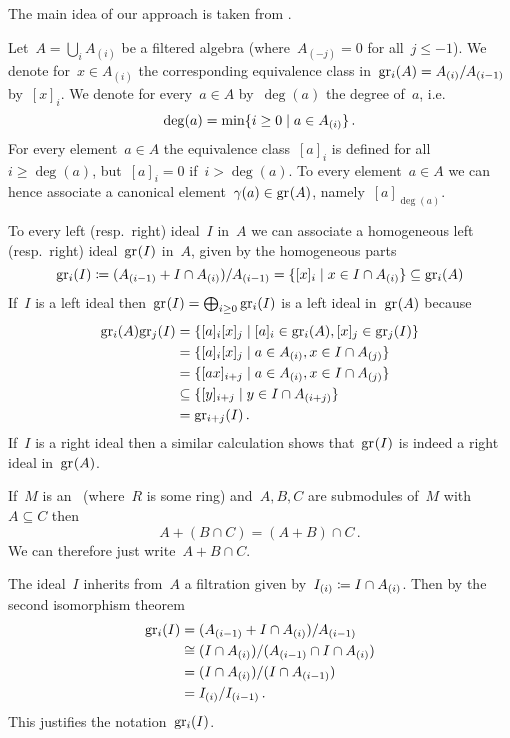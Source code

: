 \section{}

The main idea of our approach is taken from \cite[6.7]{noncommutative_noetherian}.

Let~$A = \bigcup_i A_{(i)}$ be a filtered algebra (where~$A_{(-j)} = 0$ for all~$j \leq -1$).
We denote for~$x \in A_{(i)}$ the corresponding equivalence class in~$\gr[i](A) = A_{(i)} / A_{(i-1)}$ by~$[x]_i$.
We denote for every~$a \in A$ by~$\deg(a)$ the degree of~$a$, i.e.
\[
  \deg(a)
  =
  \min
  \{
    i \geq 0
  \suchthat
    a \in A_{(i)}
  \} \,.
\]
For every element~$a \in A$ the equivalence class~$[a]_i$ is defined for all~$i \geq \deg(a)$, but~$[a]_i = 0$ if~$i > \deg(a)$.
To every element~$a \in A$ we can hence associate a canonical element~$\gamma(a) \in \gr(A)$, namely~$[a]_{\deg(a)}$.

To every left (resp.\ right) ideal~$I$ in~$A$ we can associate a homogeneous left (resp.\ right) ideal~$\gr(I)$ in~$A$, given by the homogeneous parts
\[
  \gr[i](I)
  \defined
  ( A_{(i-1)} + I \cap A_{(i)} ) / A_{(i-1)}
  =
  \{
    [x]_i
  \suchthat
    x \in I \cap A_{(i)}
  \}
  \subseteq
  \gr[i](A)
\]
If~$I$ is a left ideal then~$\gr(I) = \bigoplus_{i \geq 0} \gr[i](I)$ is a left ideal in~$\gr(A)$ because
\begin{align*}
  \gr[i](A) \gr[j](I)
  &=
  \{
    [a]_i [x]_j
  \suchthat{}
    [a]_i \in \gr[i](A),
    [x]_j \in \gr[j](I)
  \}
  \\
  &=
  \{
    [a]_i [x]_j
  \suchthat
    a \in A_{(i)},
    x \in I \cap A_{(j)}
  \}
  \\
  &=
  \{
    [a x]_{i+j}
  \suchthat
    a \in A_{(i)},
    x \in I \cap A_{(j)}
  \}
  \\
  &\subseteq
  \{
    [y]_{i+j}
  \suchthat
    y \in I \cap A_{(i+j)}
  \}
  \\
  &=
  \gr[i+j](I) \,.
\end{align*}
If~$I$ is a right ideal then a similar calculation shows that~$\gr(I)$ is indeed a right ideal in~$\gr(A)$.

\begin{recall}
  If~$M$ is an~{} (where~$R$ is some ring) and~$A, B, C$ are submodules of~$M$ with~$A \subseteq C$ then
  \[
    A + (B \cap C) = (A + B) \cap C \,.
  \]
  We can therefore just write~$A + B \cap C$.
\end{recall}

\begin{remark}
  The ideal~$I$ inherits from~$A$ a filtration given by~$I_{(i)} \coloneqq I \cap A_{(i)}$.
  Then by the second isomorphism theorem
  \begin{align*}
    \gr[i](I)
    &=
    (A_{(i-1)} + I \cap A_{(i)}) / A_{(i-1)}
    \\
    &\cong
    (I \cap A_{(i)}) / (A_{(i-1)} \cap I \cap A_{(i)})
    \\
    &=
    (I \cap A_{(i)}) / (I \cap A_{(i-1)})
    \\
    &=
    I_{(i)} / I_{(i-1)} \,.
  \end{align*}
  This justifies the notation~$\gr[i](I)$.
\end{remark}

